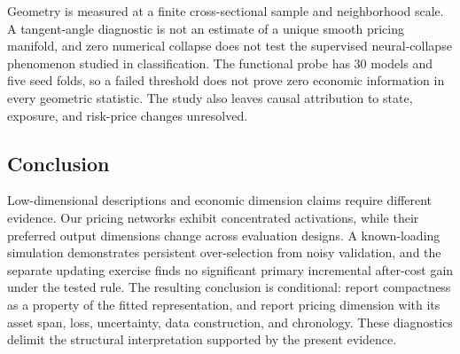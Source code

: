 Geometry is measured at a finite cross-sectional sample and neighborhood scale. A tangent-angle diagnostic is not an estimate of a unique smooth pricing manifold, and zero numerical collapse does not test the supervised neural-collapse phenomenon studied in classification. The functional probe has 30 models and five seed folds, so a failed threshold does not prove zero economic information in every geometric statistic. The study also leaves causal attribution to state, exposure, and risk-price changes unresolved.

\subsection{Conclusion}

Low-dimensional descriptions and economic dimension claims require different evidence. Our pricing networks exhibit concentrated activations, while their preferred output dimensions change across evaluation designs. A known-loading simulation demonstrates persistent over-selection from noisy validation, and the separate updating exercise finds no significant primary incremental after-cost gain under the tested rule. The resulting conclusion is conditional: report compactness as a property of the fitted representation, and report pricing dimension with its asset span, loss, uncertainty, data construction, and chronology. These diagnostics delimit the structural interpretation supported by the present evidence.
